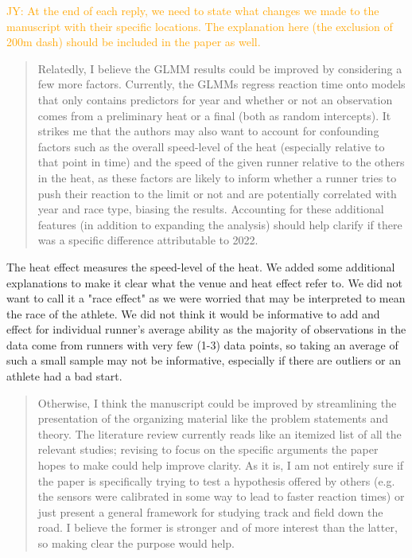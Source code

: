 \documentclass[12pt]{article}
\newcommand{\jy}[1]{\textcolor{orange}{JY: #1}}
\newenvironment{comment}%
{\begin{quotation}\noindent\small\it\color{darkblue}\ignorespaces%
}{\end{quotation}}
\begin{document}
\jy{At the end of each reply, we need to state what changes we made to
  the manuscript with their specific locations. The explanation here
  (the exclusion of 200m dash) should be included in the paper as well.}

\begin{comment}
Relatedly, I believe the GLMM results could be improved by considering a few
more factors. Currently, the GLMMs regress reaction time onto models that only
contains predictors for year and whether or not an observation comes from a
preliminary heat or a final (both as random intercepts). It strikes me that the
authors may also want to account for confounding factors such as the overall
speed-level of the heat (especially relative to that point in time) and the
speed of the given runner relative to the others in the heat, as these factors
are likely to inform whether a runner tries to push their reaction to the limit
or not and are potentially correlated with year and race type, biasing the
results. Accounting for these additional features (in addition to expanding the
analysis) should help clarify if there was a specific difference attributable to
2022.
\end{comment} 


The heat effect measures the speed-level of the heat.  We added some additional
explanations to make it clear what the venue and heat effect refer to. We did
not want to call it a "race effect" as we were worried that may be interpreted
to mean the race of the athlete.  We did not think it would be informative to 
add and effect for individual runner's average ability as the majority of
observations in the data come from runners with very few (1-3) data points,
so taking an average of such a small sample may not be informative, especially
if there are outliers or an athlete had a bad start.


\begin{comment}
Otherwise, I think the manuscript could be improved by streamlining the
presentation of the organizing material like the problem statements and theory.
The literature review currently reads like an itemized list of all the relevant
studies; revising to focus on the specific arguments the paper hopes to make
could help improve clarity. As it is, I am not entirely sure if the paper is
specifically trying to test a hypothesis offered by others (e.g. the sensors
were calibrated in some way to lead to faster reaction times) or just present a
general framework for studying track and field down the road. I believe the
former is stronger and of more interest than the latter, so making clear the
purpose would help.
\end{comment}  
\end{document}
